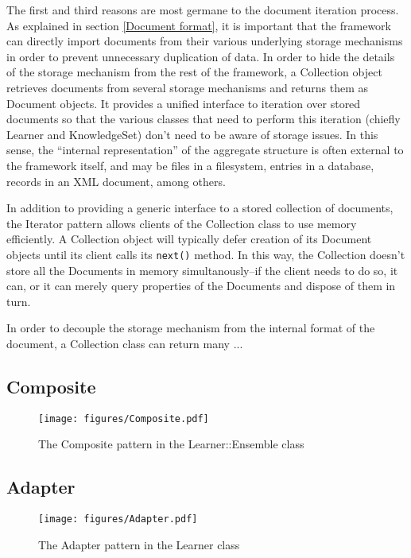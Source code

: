 \documentclass[a4paper]{report}
\begin{document}
The first and third reasons are most germane to the document iteration
process.  As explained in section \ref{Document format}, it is
important that the framework can directly import documents from their
various underlying storage mechanisms in order to prevent unnecessary
duplication of data.  In order to hide the details of the storage
mechanism from the rest of the framework, a Collection object
retrieves documents from several storage mechanisms and returns them
as Document objects.  It provides a unified interface to iteration
over stored documents so that the various classes that need to perform
this iteration (chiefly Learner and KnowledgeSet) don't need to be
aware of storage issues.  In this sense, the ``internal
representation'' of the aggregate structure is often external to the
framework itself, and may be files in a filesystem, entries in a
database, records in an XML document, among others.

In addition to providing a generic interface to a stored collection of
documents, the Iterator pattern allows clients of the Collection class
to use memory efficiently.  A Collection object will typically defer
creation of its Document objects until its client calls its
\texttt{next()} method.  In this way, the Collection doesn't store all
the Documents in memory simultanously--if the client needs to do so,
it can, or it can merely query properties of the Documents and dispose
of them in turn.

In order to decouple the storage mechanism from the internal format of
the document, a Collection class can return many ...


\subsection{Composite}
\begin{figure}
\texttt{[image: figures/Composite.pdf]}
\caption{The Composite pattern in the Learner::Ensemble class}
\label{Composite-ensemble}
\end{figure}

\subsection{Adapter}
\begin{figure}
\texttt{[image: figures/Adapter.pdf]}
\caption{The Adapter pattern in the Learner class}
\label{Adapter-learner}
\end{figure}
\end{document}
